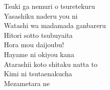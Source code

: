 \begin{multicols}{2}
Tsuki ga nemuri o tsuretekuru\\
Yasashiku naderu you ni\\
Watashi wa madamada ganbareru\\
Hitori sotto tsubuyaita\\
Hora mou daijoubu!\\
Hayame ni okiyou kana\\
Atarashii koto shitaku natta to\\
Kimi ni tsutaenakucha\\
Mezametara ne
\end{multicols}

\ifdefined\COMPLETE
\else
	
\fi
